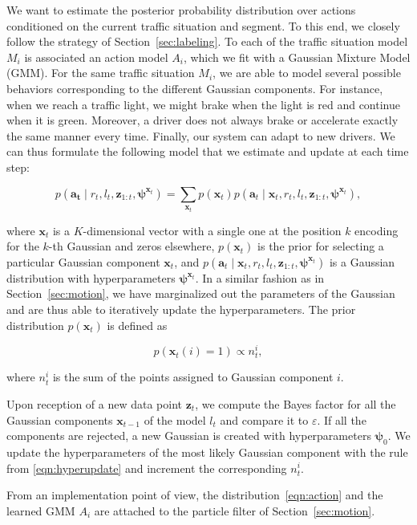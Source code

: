 We want to estimate the posterior probability distribution over actions
conditioned on the current traffic situation and segment. To this end, we
closely follow the strategy of Section~\ref{sec:labeling}. To each of the
traffic situation model $M_i$ is associated an action model $A_i$, which we fit
with a Gaussian Mixture Model (GMM). For the same traffic situation $M_i$, we
are able to model several possible behaviors corresponding to the different
Gaussian components. For instance, when we reach a traffic light, we might brake
when the light is red and continue when it is green. Moreover, a driver does not
always brake or accelerate exactly the same manner every time. Finally, our
system can adapt to new drivers. We can thus formulate the following model that
we estimate and update at each time step:

\begin{equation}
\label{eqn:action}
p(\mathbf{a_t} \mid r_t, l_t,\mathbf{z}_{1:t},\boldsymbol{\psi}^{\mathbf{x}_t})=
\sum_{\mathbf{x}_t} p(\mathbf{x}_t)p(\mathbf{a}_t\mid\mathbf{x}_t,r_t,l_t,
\mathbf{z}_{1:t},\boldsymbol{\psi}^{\mathbf{x}_t}),
\end{equation}

where $\mathbf{x}_t$ is a $K$-dimensional vector with a single one at the
position $k$ encoding for the $k$-th Gaussian and zeros elsewhere,
$p(\mathbf{x}_t)$ is the prior for selecting a particular Gaussian component
$\mathbf{x}_t$, and $p(\mathbf{a}_t\mid\mathbf{x}_t,r_t,l_t,
\mathbf{z}_{1:t},\boldsymbol{\psi}^{\mathbf{x}_t})$ is a Gaussian distribution
with hyperparameters $\boldsymbol{\psi}^{\mathbf{x}_t}$. In a similar fashion as
in Section~\ref{sec:motion}, we have marginalized out the parameters of the
Gaussian and are thus able to iteratively update the hyperparameters. The
prior distribution $p(\mathbf{x}_t)$ is defined as

\begin{equation}
\label{eqn:gaussianprior}
p(\mathbf{x}_t(i)=1)\propto n_t^i,
\end{equation}

where $n_t^i$ is the sum of the points assigned to Gaussian component $i$.

Upon reception of a new data point $\mathbf{z}_t$, we compute the Bayes factor
for all the Gaussian components $\mathbf{x}_{t-1}$ of the model $l_t$ and 
compare it to $\varepsilon$. If all the components are rejected, a new
Gaussian is created with hyperparameters $\boldsymbol{\psi}_0$. We update the
hyperparameters of the most likely Gaussian component with the rule from
\eqref{eqn:hyperupdate} and increment the corresponding $n_t^i$.

From an implementation point of view, the distribution~\eqref{eqn:action} and
the learned GMM $A_i$ are attached to the particle filter of
Section~\ref{sec:motion}.
